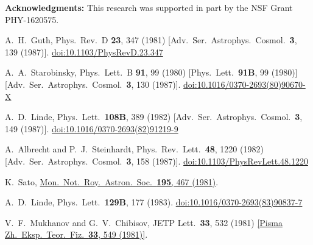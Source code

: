 \documentclass[11pt]{article}
\begin{document}
\textbf{Acknowledgments:}
This research was supported in part by the NSF Grant PHY-1620575.

\clearpage

\begin{thebibliography}{99}
  A.~H.~Guth,
  Phys.\ Rev.\ D {\bf 23}, 347 (1981)
  [Adv.\ Ser.\ Astrophys.\ Cosmol.\  {\bf 3}, 139 (1987)].
  \href{https://dx.doi.org/10.1103/PhysRevD.23.347}{doi:10.1103/PhysRevD.23.347}

  A.~A.~Starobinsky,
  Phys.\ Lett.\ B {\bf 91}, 99 (1980)
  [Phys.\ Lett.\  {\bf 91B}, 99 (1980)]
  [Adv.\ Ser.\ Astrophys.\ Cosmol.\  {\bf 3}, 130 (1987)].
  \href{https://dx.doi.org/10.1016/0370-2693(80)90670-X}{doi:10.1016/0370-2693(80)90670-X}

  A.~D.~Linde,
  Phys.\ Lett.\  {\bf 108B}, 389 (1982)
  [Adv.\ Ser.\ Astrophys.\ Cosmol.\  {\bf 3}, 149 (1987)].
  \href{https://dx.doi.org/10.1016/0370-2693(82)91219-9}{doi:10.1016/0370-2693(82)91219-9}

  A.~Albrecht and P.~J.~Steinhardt,
  Phys.\ Rev.\ Lett.\  {\bf 48}, 1220 (1982)
  [Adv.\ Ser.\ Astrophys.\ Cosmol.\  {\bf 3}, 158 (1987)].
  \href{https://dx.doi.org/10.1103/PhysRevLett.48.1220}{doi:10.1103/PhysRevLett.48.1220}

  K.~Sato,
  \href{http://articles.adsabs.harvard.edu/full/1981MNRAS.195..467S}{Mon.\ Not.\ Roy.\ Astron.\ Soc.\  {\bf 195}, 467 (1981)}.

  A.~D.~Linde,
  Phys.\ Lett.\  {\bf 129B}, 177 (1983).
  \href{https://dx.doi.org/10.1016/0370-2693(83)90837-7}{doi:10.1016/0370-2693(83)90837-7}

  V.~F.~Mukhanov and G.~V.~Chibisov,
  JETP Lett.\  {\bf 33}, 532 (1981)
  \href{http://inspirehep.net/record/170051/files/article_23079.pdf?version=1}{[Pisma Zh.\ Eksp.\ Teor.\ Fiz.\  {\bf 33}, 549 (1981)]}.


\end{thebibliography}
\end{document}
